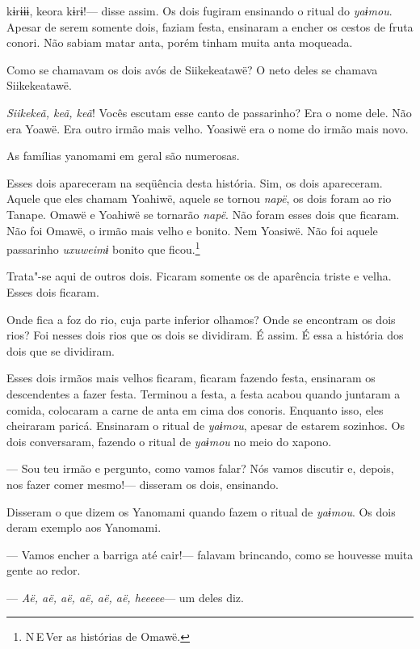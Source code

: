  

 kɨrɨɨɨ, keora kɨrɨ!--- disse assim. 
Os dois fugiram ensinando o ritual do \emph{yaɨmou}. Apesar de serem
somente dois, faziam festa, ensinaram a encher os cestos de fruta
conori. Não sabiam matar anta, porém tinham muita anta moqueada. 

Como se chamavam os dois avós de Siikekeatawë? O neto deles se chamava
Siikekeatawë. 

\emph{Siikekeã, keã, keã}! Vocês escutam esse canto de passarinho? Era o
nome dele. Não era Yoawë. Era outro irmão mais velho. Yoasiwë era o nome
do irmão mais novo. 

As famílias yanomami em geral são numerosas. 

Esses dois apareceram na seqüência desta história. Sim, os dois
apareceram. Aquele que eles chamam Yoahiwë, aquele se
tornou \emph{napë}, os dois foram ao rio Tanape. Omawë e Yoahiwë se
tornarão \emph{napë}. Não foram esses dois que ficaram. Não foi Omawë, o
irmão mais velho e bonito. Nem Yoasiwë. Não foi aquele
passarinho \emph{uxuweimɨ} bonito que ficou.\footnote{ N\,E\,Ver as histórias de Omawë.} 

Trata"-se aqui de outros dois. Ficaram somente os de aparência triste e
velha. Esses dois ficaram.

Onde fica a foz do rio, cuja parte inferior olhamos? Onde se encontram
os dois rios? Foi nesses dois rios que os dois se dividiram. É assim. É essa a história dos dois que se dividiram. 

Esses dois irmãos mais velhos ficaram, ficaram fazendo festa, ensinaram
os descendentes a fazer festa. Terminou a festa, a festa acabou quando
juntaram a comida, colocaram a carne de anta em cima dos conoris.
Enquanto isso, eles cheiraram paricá. Ensinaram o ritual
de \emph{yaɨmou}, apesar de estarem sozinhos. Os dois conversaram,
fazendo o ritual de \emph{yaɨmou} no meio do xapono. 

--- Sou teu irmão e pergunto, como vamos falar? Nós vamos discutir e,
depois, nos fazer comer mesmo!--- disseram os dois, ensinando. 

Disseram o que dizem os Yanomami quando fazem o ritual de \emph{yaɨmou}.
Os dois deram exemplo aos Yanomami. 

--- Vamos encher a barriga até cair!--- falavam brincando, como se
houvesse muita gente ao redor. 

--- \emph{Aë, aë, aë, aë, aë, aë, heeeee}--- um deles diz. 


